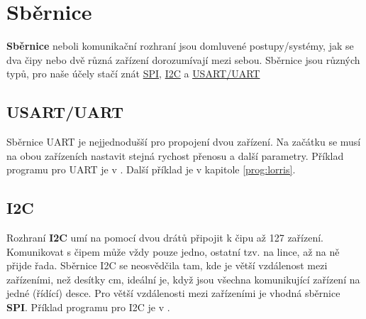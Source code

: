 \section{Sběrnice}


\textbf{Sběrnice}  neboli komunikační rozhraní jsou domluvené postupy/systémy, jak se dva čipy nebo dvě různá zařízení dorozumívají mezi sebou. 
Sběrnice jsou různých typů, pro naše účely stačí znát  
\href{https://maly.gitbooks.io/hradla-volty-jednocipy/23_seriova_komunikace/231_seriova_sbernice_spi.html}{SPI}, 
\href{https://maly.gitbooks.io/hradla-volty-jednocipy/23_seriova_komunikace/232_seriova_sbernice_i2c.html}{I2C}  
a \href{https://maly.gitbooks.io/hradla-volty-jednocipy/23_seriova_komunikace/235_rs-232,_uart,_serial.html}{USART/UART}

\subsection{USART/UART} \label{uart}

Sběrnice UART je nejjednodušší pro propojení dvou zařízení. Na začátku se musí na obou zařízeních nastavit stejná rychost přenosu 
a další parametry. Příklad programu pro UART je v \cite[strana~144]{ard}. Další příklad je v kapitole \ref{prog:lorris}.

\subsection{I2C} \label{i2c} \label{spi}  

Rozhraní \textbf{I2C}  umí na pomocí dvou drátů připojit k čipu až 127 zařízení. Komunikovat s čipem může vždy pouze jedno, ostatní tzv.  na lince, až na ně přijde řada. 
Sběrnice I2C se neosvědčila tam, kde je větší vzdálenost mezi zařízeními, než desítky cm, ideální je, když jsou všechna komunikující zařízení na jedné (řídící) desce. 
Pro větší vzdálenosti mezi zařízeními je vhodná sběrnice \textbf{SPI}. 
Příklad programu pro I2C je v \cite[strana~152]{ard}.


